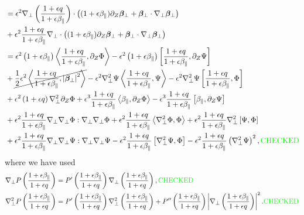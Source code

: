 \documentclass{article}
\newcommand{\para}{\parallel}
\newcommand{\ep}{\epsilon}
\newcommand{\np}{\nabla_\perp}
\newcommand{\p}{\partial}
\newcommand{\fr}{\frac{1+\ep q}{1+\ep\beta_\para}}
\newcommand{\frinv}{\frac{1+\ep\beta_\para}{1+\ep q}}
\newcommand{\pth} [1] {\left( #1 \right) }
\newcommand{\br} [1] {\left[ #1 \right] }
\begin{document}
\begin{align*}
    &= \ep^2 \np \pth{\fr} \cdot \pth{(1+\ep\beta_\para) \p_Z \bm{\beta}_\perp + \bm{\beta}_\perp \cdot\np \bm{\beta}_\perp} \\ 
    &+ \ep^2 \fr \np\cdot \pth{(1+\ep\beta_\para) \p_Z \bm{\beta}_\perp + \bm{\beta}_\perp \cdot\np \bm{\beta}_\perp} \\ 
        &= \ep^2\pth{1+\ep\beta_\para}\Braket{\fr, \p_Z\Phi} - \ep^2\pth{1+\ep\beta_\para}\br{\fr, \p_Z\Psi} \\ 
        &+ \cancel{\frac{1}{2}\ep^2\Braket{\fr, \left|\bm{\beta}_\perp \right|^2}} -\ep^2\np^2\Psi \Braket{\fr, \Psi} -\ep^2\np^2\Psi\br{\fr, \Phi} \\ 
        &+ \ep^2\pth{1+\ep q}\np^2\p_Z\Phi + \ep^3\fr \Braket{\beta_\para, \p_Z\Phi} - \ep^3\fr\br{\beta_\para, \p_Z\Psi} \\ 
        &+ \ep^2\fr\np\np\Phi:\np\np\Phi + \ep^2\fr\Braket{\np^2\Phi, \Phi} + \ep^2\fr\np^2\br{\Psi,\Phi} \\ 
        &+ \ep^2\fr\np\np\Psi:\np\np\Psi - \ep^2\fr\br{\np^2\Psi, \Phi} - \ep^2\fr\pth{\np^2\Psi}^2, \text{\color{green}CHECKED} 
\end{align*}
where we have used 
\begin{align*} 
    \np P\pth{\frinv} &= P'\pth{\frinv} \np\pth{\frinv}, \text{\color{green}CHECKED} \\ 
    \np^2 P\pth{\frinv} &= P'\pth{\frinv}\np^2\pth{\frinv} + P''\pth{\frinv} \left| \np\pth{\frinv} \right|^2. \text{\color{green}CHECKED} 
\end{align*}
\end{document}
